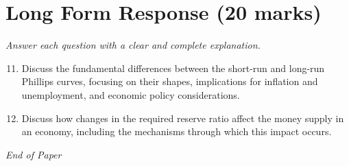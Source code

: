 \documentclass[12pt]{article}
\begin{document}
\section*{Long Form Response (20 marks)}
\textit{Answer each question with a clear and complete explanation.}
\begin{enumerate}[label=\arabic*.]
\setcounter{enumi}{10}
\item Discuss the fundamental differences between the short-run and long-run Phillips curves, focusing on their shapes, implications for inflation and unemployment, and economic policy considerations.
\item Discuss how changes in the required reserve ratio affect the money supply in an economy, including the mechanisms through which this impact occurs.
\end{enumerate}

\vfill
\noindent\textit{End of Paper}
\end{document}
